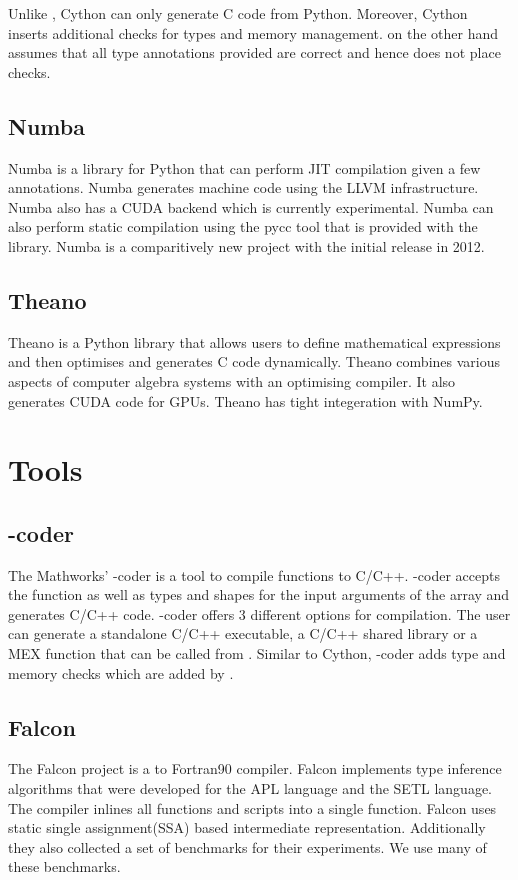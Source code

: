 Unlike \velocty, Cython can only generate C code from Python. Moreover, Cython inserts additional checks for types and memory management. \velocty on the other hand assumes that all type annotations provided are correct and hence does not place checks.
\subsection{Numba}
Numba\cite{numba} is a library for Python that can perform JIT compilation given a few annotations. Numba generates machine code using the LLVM\cite{Lattner:2004:LCF:977395.977673} infrastructure. Numba also has a CUDA\cite{Nickolls:2008:SPP:1365490.1365500} backend which is currently experimental. Numba can also perform static compilation using the pycc tool that is provided with the library. Numba is a comparitively new project with the initial release in 2012. 
\subsection{Theano}
Theano\cite{Bastien-Theano-2012} is a Python library that allows users to define mathematical expressions and then optimises and generates C code dynamically. Theano combines various aspects of computer algebra systems with an optimising compiler. It also generates CUDA code for GPUs. Theano has tight integeration with NumPy.
\section{\matlab Tools}
\subsection{\matlab-coder}
The Mathworks' \matlab-coder\cite{matlab-coder} is a tool to compile \matlab functions to C/C++. \matlab-coder accepts the \matlab function as well as types and shapes for the input arguments of the array and generates C/C++ code. \matlab-coder offers 3 different options for compilation. The user can generate a standalone C/C++ executable, a C/C++ shared library or a MEX\cite{mex} function that can be called from \matlab. Similar to Cython, \matlab-coder adds type and memory checks which are added by \velocty.
\subsection{Falcon}
The Falcon project\cite{DeRose:1999} is a \matlab to Fortran90 compiler. Falcon implements type inference algorithms that were developed for the APL\cite{Budd:1983:ACU:390005.801218,Joisha:2000:CDI:570406.570408,Weiss:1981:CTS:390007.805380} language and the SETL\cite{Schwartz:1975:ADS:512976.512981} language. The compiler inlines all functions and scripts into a single function. Falcon uses static single assignment(SSA) based intermediate representation. Additionally they also collected a set of benchmarks for their experiments. We use many of these benchmarks. 
